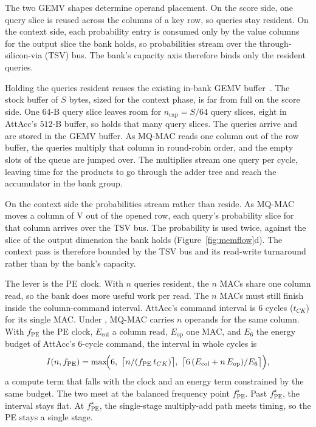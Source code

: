 The two GEMV shapes determine operand placement.
On the score side, one query slice is reused across the
columns of a key row, so queries stay resident.
On the context side, each probability entry is consumed only
by the value columns for the output slice the bank holds, so
probabilities stream over the through-silicon-via (TSV) bus.
The bank's capacity axis therefore binds only the resident
queries.

Holding the queries resident reuses the existing in-bank
GEMV buffer~\cite{attacc}.
The stock buffer of $S$ bytes, sized for the context phase,
is far from full on the score side.
One $64$-B query slice leaves room for
$n_{\mathrm{cap}}=S/64$ query slices, eight in AttAcc's
$512$-B buffer, so \Fugue{} holds that many query slices.
The queries arrive and are stored in the GEMV buffer.
As MQ-MAC reads one column out of the row buffer,
the queries multiply that column in round-robin order, and
the empty slots of the queue are jumped over.
The multiplies stream one query per cycle, leaving time for
the products to go through the adder tree and reach the
accumulator in the bank group.

On the context side the probabilities stream rather than
reside.
As MQ-MAC moves a column of V out of the opened
row, each query's probability slice for that column arrives
over the TSV bus.
The probability is used twice, against the slice of the
output dimension the bank holds
(Figure~\ref{fig:memflow}d).
The context pass is therefore bounded by the TSV bus and its
read-write turnaround rather than by the bank's capacity.

The lever is the PE clock.
With $n$ queries resident, the $n$ MACs share one column
read, so the bank does more useful work per read.
The $n$ MACs must still finish inside the column-command
interval.
AttAcc's command interval is $6$ cycles ($t_{CK}$) for its
single MAC.
Under \Fugue{}, MQ-MAC carries $n$ operands for the same
column.
With $f_{\mathrm{PE}}$ the PE clock,
$E_{\mathrm{col}}$ a column read, $E_{\mathrm{op}}$ one MAC,
and $E_6$ the energy budget of AttAcc's $6$-cycle command,
the interval in whole cycles is
\begin{equation}
I(n,f_{\mathrm{PE}})=\max\!\Bigl(6,\ \bigl\lceil n/(f_{\mathrm{PE}}\,t_{CK})\bigr\rceil,\
\bigl\lceil 6\,(E_{\mathrm{col}}+n\,E_{\mathrm{op}})/E_6\bigr\rceil\Bigr),
\label{eq:interval}
\end{equation}
a compute term that falls with the clock and an energy term
constrained by the same budget.
The two meet at the balanced frequency point
$f_{\mathrm{PE}}^\star$.
Past $f_{\mathrm{PE}}^\star$, the interval stays flat.
At $f_{\mathrm{PE}}^\star$, the single-stage multiply-add
path meets timing, so the PE stays a single stage.

